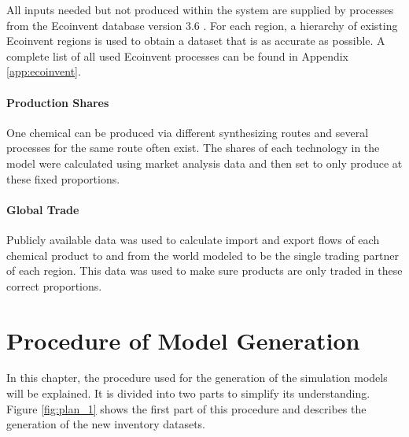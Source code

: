 All inputs needed but not produced within the system are supplied by processes from the Ecoinvent database version 3.6 \cite{Ecoinvent.2020}. For each region, a hierarchy of existing Ecoinvent regions is used to obtain a dataset that is as accurate as possible. A complete list of all used Ecoinvent processes can be found in Appendix \ref{app:ecoinvent}.


\paragraph{Production Shares}

One chemical can be produced via different synthesizing routes and several processes for the same route often exist. The shares of each technology in the model were calculated using market analysis data and then set to only produce at these fixed proportions.

\paragraph{Global Trade}
Publicly available data was used to calculate import and export flows of each chemical product to and from the world modeled to be the single trading partner of each region. This data was used to make sure products are only traded in these correct proportions. 







\section{Procedure of Model Generation}

In this chapter, the procedure used for the generation of the simulation models will be explained. It is divided into two parts to simplify its understanding. Figure \ref{fig:plan_1} shows the first part of this procedure and describes the generation of the new inventory datasets.

